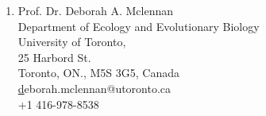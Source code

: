 \documentclass[11pt]{article}
\begin{document}
\begin{enumerate}
\item Prof. Dr. Deborah A. Mclennan\\Department of Ecology and Evolutionary Biology\\University of Toronto,\\25 Harbord St.\\Toronto, ON., M5S 3G5, Canada \\\href{deborah.mclennan@utoronto.ca}deborah.mclennan@utoronto.ca\\+1 416-978-8538
\end{enumerate}
\end{document}
